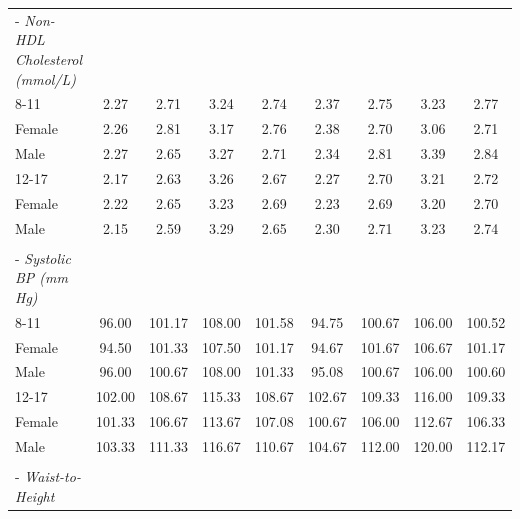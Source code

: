 \documentclass[12pt,leqno,titlepage]{amsart}
\newcommand{\1}{\mathbbm{1}}
\begin{document}
\begin{bibunit}
\begin{table}[!t]
\begin{tabular*}{\linewidth}{@{\extracolsep{\fill}}lcccc|cccc@{}}
\hspace*{0.8em}- \textit{Non-HDL Cholesterol (mmol/L)} & & & & & & & & \\
\hspace*{2.2em}8-11 & 2.27 & 2.71 & 3.24 & 2.74 & 2.37 & 2.75 & 3.23 & 2.77 \\
\hspace*{4.4em}Female & 2.26 & 2.81 & 3.17 & 2.76 & 2.38 & 2.70 & 3.06 & 2.71 \\
\hspace*{4.4em}Male & 2.27 & 2.65 & 3.27 & 2.71 & 2.34 & 2.81 & 3.39 & 2.84 \\
\hspace*{2.2em}12-17 & 2.17 & 2.63 & 3.26 & 2.67 & 2.27 & 2.70 & 3.21 & 2.72 \\
\hspace*{4.4em}Female & 2.22 & 2.65 & 3.23 & 2.69 & 2.23 & 2.69 & 3.20 & 2.70 \\
\hspace*{4.4em}Male & 2.15 & 2.59 & 3.29 & 2.65 & 2.30 & 2.71 & 3.23 & 2.74 \\
\rule{0pt}{1.1em} & & & & & & & & \\
\hspace*{0.8em}- \textit{Systolic BP (mm Hg)} & & & & & & & & \\
\hspace*{2.2em}8-11 & 96.00 & 101.17 & 108.00 & 101.58 & 94.75 & 100.67 & 106.00 & 100.52 \\
\hspace*{4.4em}Female & 94.50 & 101.33 & 107.50 & 101.17 & 94.67 & 101.67 & 106.67 & 101.17 \\
\hspace*{4.4em}Male & 96.00 & 100.67 & 108.00 & 101.33 & 95.08 & 100.67 & 106.00 & 100.60 \\
\hspace*{2.2em}12-17 & 102.00 & 108.67 & 115.33 & 108.67 & 102.67 & 109.33 & 116.00 & 109.33 \\
\hspace*{4.4em}Female & 101.33 & 106.67 & 113.67 & 107.08 & 100.67 & 106.00 & 112.67 & 106.33 \\
\hspace*{4.4em}Male & 103.33 & 111.33 & 116.67 & 110.67 & 104.67 & 112.00 & 120.00 & 112.17 \\
\rule{0pt}{1.1em} & & & & & & & & \\
\hspace*{0.8em}- \textit{Waist-to-Height} & & & & & & & & \\

\end{tabular*}
\end{table}
\end{bibunit}
\end{document}
